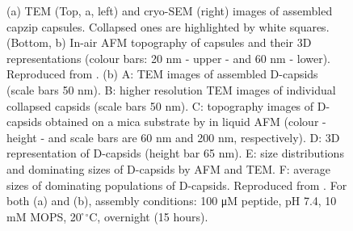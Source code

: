 \begin{figure}
\begin{center}
 \hspace{0.3cm}
\caption[Miscoscopy experiments results on capzip capsules]{(a) TEM (Top, a, left) and cryo-SEM (right) images of assembled capzip capsules. Collapsed ones are highlighted by white squares. (Bottom, b) In-air AFM topography of capsules and their 3D representations (colour bars: 20 nm - upper - and 60 nm - lower). Reproduced from \citet{Castelletto2016}. (b) A: TEM images of assembled D-capsids (scale bars 50 nm). B: higher resolution TEM images of individual collapsed capsids (scale bars 50 nm). C: topography images of D-capsids obtained on a mica substrate by in liquid AFM (colour - height - and scale bars are 60 nm and 200 nm, respectively). D: 3D representation of D-capsids (height bar 65 nm). E: size distributions and dominating sizes of D-capsids by AFM and TEM. F: average sizes of dominating populations of D-capsids. Reproduced from \citet{Kepiro2019}. For both (a) and (b), assembly conditions: 100 μM peptide, pH 7.4, 10 mM MOPS, 20 ̊$^{\circ}$C, overnight (15 hours).} \label{fig:exp_structure}
\end{center}
\end{figure}

